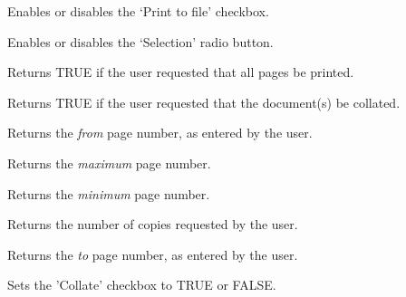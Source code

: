 

Enables or disables the `Print to file' checkbox.



Enables or disables the `Selection' radio button.



Returns TRUE if the user requested that all pages be printed.



Returns TRUE if the user requested that the document(s) be collated.



Returns the {\it from} page number, as entered by the user.



Returns the {\it maximum} page number.



Returns the {\it minimum} page number.



Returns the number of copies requested by the user.



Returns the {\it to} page number, as entered by the user.



Sets the 'Collate' checkbox to TRUE or FALSE.



